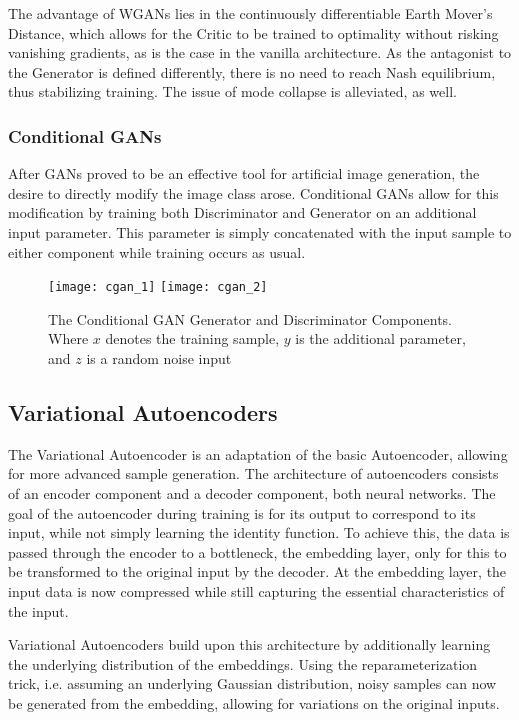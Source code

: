 \documentclass[../main]{subfiles}
\begin{document}
The advantage of WGANs lies in the continuously differentiable Earth Mover's Distance, which allows for the Critic to be trained to optimality without risking vanishing gradients, as is the case in the vanilla architecture.  As the antagonist to the Generator is defined differently, there is no need to reach Nash equilibrium, thus stabilizing training. The issue of mode collapse is alleviated, as well. 
 
\subsubsection{Conditional GANs \cite{cgans}}
After GANs proved to be an effective tool for artificial image generation, the desire to directly modify the image class arose. Conditional GANs allow for this modification by training both Discriminator and Generator on an additional input parameter.  This parameter is simply concatenated with the input sample to either component while training occurs as usual.

\begin{figure}[h]
	\centering
	\texttt{[image: cgan\_1]}
	\texttt{[image: cgan\_2]}
	\caption{The Conditional GAN Generator and Discriminator Components.  Where $x$ denotes the training sample, $y$ is the additional parameter,  	and $z$ is a random noise input}
\end{figure}


\subsection{Variational Autoencoders}
The Variational Autoencoder is an adaptation of the basic Autoencoder, allowing for more advanced sample generation.  The architecture of autoencoders consists of an encoder component and a decoder component, both neural networks. The goal of the autoencoder during training is for its output to correspond to its input,  while not simply learning the identity function. To achieve this, the data is passed through the encoder to a bottleneck, the embedding layer, only for this to be transformed to the original input by the decoder. At the embedding layer, the input data is now compressed while still capturing the essential characteristics of the input. 

Variational Autoencoders build upon this architecture by additionally learning the underlying distribution of the embeddings. Using the reparameterization trick, i.e. assuming an underlying Gaussian distribution,  noisy samples can now be generated from the embedding, allowing for variations on the original inputs. \cite{vaes}
\end{document}
